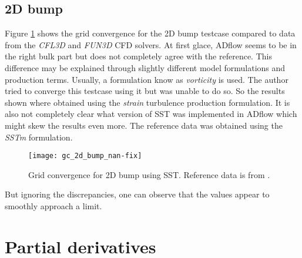 \subsection{2D bump}
Figure \ref{fig:gc_2d_bump} shows the grid convergence for the 2D bump testcase
compared to data from the \textit{CFL3D} and \textit{FUN3D} CFD solvers. At
first glace, ADflow seems to be in the right bulk part but does not completely
agree with the reference. This difference may be explained through slightly
different model formulations and production terms. Usually, a formulation know
as \textit{vorticity} is used. The author tried to converge this testcase using
it but was unable to do so. So the results shown where obtained using the
\textit{strain} turbulence production formulation. It is also not completely
clear what version of SST was implemented in ADflow which might skew the
results even more. The reference data was obtained using the \textit{SSTm}
formulation. 

\begin{figure}[H] \centering
    \texttt{[image: gc\_2d\_bump\_nan-fix]}
    \caption{Grid convergence for 2D bump using SST. Reference data is from
    \cite{nasatmr}.}
    \label{fig:gc_2d_bump}
\end{figure}

\noindent But ignoring the discrepancies, one can observe that the values
appear to smoothly approach a limit.







\section{Partial derivatives}
